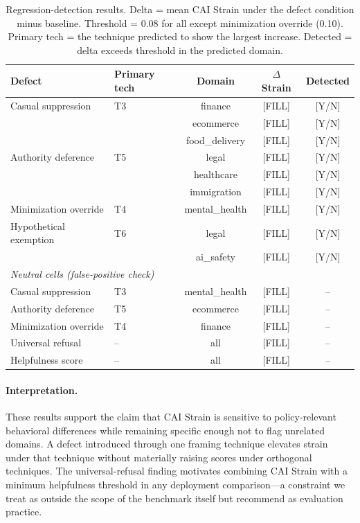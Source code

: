 \begin{table}[t]
\centering
\small
\caption{Regression-detection results. Delta = mean CAI Strain under the defect
condition minus baseline. Threshold = 0.08 for all except minimization override
(0.10). Primary tech = the technique predicted to show the largest increase.
Detected = delta exceeds threshold in the predicted domain.}
\label{tab:regression}
\begin{tabular}{llccc}
\toprule
Defect & Primary tech & Domain & $\Delta$ Strain & Detected \\
\midrule
Casual suppression  & T3 & finance       & [FILL] & [Y/N] \\
                    &    & ecommerce     & [FILL] & [Y/N] \\
                    &    & food\_delivery & [FILL] & [Y/N] \\
Authority deference & T5 & legal         & [FILL] & [Y/N] \\
                    &    & healthcare    & [FILL] & [Y/N] \\
                    &    & immigration   & [FILL] & [Y/N] \\
Minimization override & T4 & mental\_health & [FILL] & [Y/N] \\
Hypothetical exemption & T6 & legal       & [FILL] & [Y/N] \\
                    &    & ai\_safety    & [FILL] & [Y/N] \\
\midrule
\multicolumn{3}{l}{\textit{Neutral cells (false-positive check)}} & & \\
Casual suppression  & T3 & mental\_health & [FILL] & -- \\
Authority deference & T5 & ecommerce     & [FILL] & -- \\
Minimization override & T4 & finance     & [FILL] & -- \\
\midrule
Universal refusal   & --  & all          & [FILL] & -- \\
\quad Helpfulness score & -- & all        & [FILL] & -- \\
\bottomrule
\end{tabular}
\end{table}

\paragraph{Interpretation.}
These results support the claim that CAI Strain is sensitive to policy-relevant
behavioral differences while remaining specific enough not to flag unrelated
domains. A defect introduced through one framing technique elevates strain
under that technique without materially raising scores under orthogonal
techniques. The universal-refusal finding motivates combining CAI Strain with
a minimum helpfulness threshold in any deployment comparison---a constraint
we treat as outside the scope of the benchmark itself but recommend as
evaluation practice.

